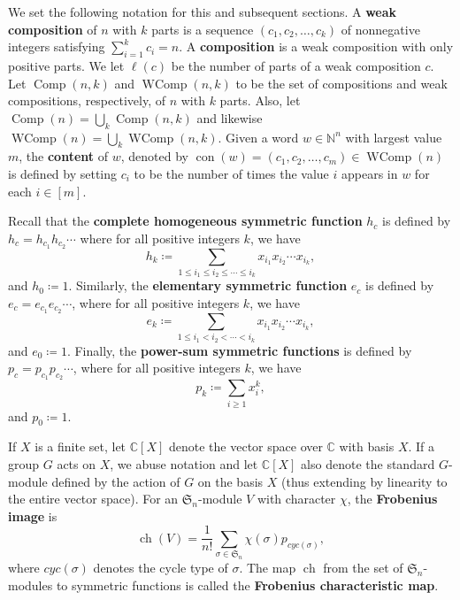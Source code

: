 \documentclass{amsart}
\newcommand{\N}{\mathbb{N}}
\renewcommand{\S}{\mathfrak{S}}
\newcommand{\CC}{\mathbb{C}}
\DeclareMathOperator{\Comp}{Comp}
\DeclareMathOperator{\WComp}{WComp}
\DeclareMathOperator{\ch}{ch}
\DeclareMathOperator{\con}{con}
\newcommand{\defterm}{\textbf}
\theoremstyle{definition}
\begin{document}
We set the following notation for this and subsequent sections. A \textbf{weak composition} of $n$ with $k$ parts is a sequence $(c_1,c_2,\dots,c_k)$ of nonnegative integers satisfying $\sum_{i=1}^k c_i=n$. 
A \textbf{composition} is a weak composition with only positive parts. 
We let $\ell(c)$ be the number of parts of a weak composition $c$.
Let $\Comp(n,k)$ and $\WComp(n,k)$ to be the set of compositions and weak compositions, respectively, of $n$ with $k$ parts. 
Also, let $\Comp(n)=\bigcup_{k}\Comp(n,k)$ and likewise $\WComp(n)=\bigcup_{k}\WComp(n,k)$. 
Given a word $w\in \N^n$ with largest value $m$, the \textbf{content} of $w$, denoted by $\con(w)=(c_1,c_2,\ldots,c_m)\in\WComp(n)$ is defined by setting $c_i$ to be the number of times the value $i$ appears in $w$ for each $i\in[m]$.

Recall that the \defterm{complete homogeneous symmetric function} 
$h_c$ is defined by $h_c=h_{c_1}h_{c_2}\cdots$ where for all positive integers $k$, we have 
\[h_k\coloneqq \sum_{1\leq i_1\leq i_2\leq \cdots\leq i_k}x_{i_1}x_{i_2}\cdots x_{i_k},\]
and $h_0\coloneqq 1$. 
Similarly, the \defterm{elementary symmetric function} $e_c$ is defined by $e_c=e_{c_1}e_{c_2}\cdots$, where for all positive integers $k$, we have 
\[e_k\coloneqq \sum_{1\leq i_1< i_2<\cdots<i_k}x_{i_1}x_{i_2}\cdots x_{i_k},\]
and $e_0\coloneqq1$. 
Finally, the \defterm{power-sum symmetric functions} 
is defined by $p_c=p_{c_1}p_{c_2}\cdots $, where for all positive integers $k$, we have
\[p_k\coloneqq \sum_{i\geq 1}x_i^k,\]
and $p_0\coloneqq 1$.

If $X$ is a finite set, let $\CC[X]$ denote the vector space over $\CC$ with basis $X$. 
If a group $G$ acts on $X$, we abuse notation and let $\CC[X]$ also denote the standard $G$-module defined by the action of $G$ on the basis $X$ (thus extending by linearity to the entire vector space). 
For an $\S_n$-module $V$ with character $\chi$, the \defterm{Frobenius image} is 
\[\ch(V)=\frac{1}{n!}\sum_{\sigma\in \S_n}\chi(\sigma)p_{cyc(\sigma)},\]
where $cyc(\sigma)$ denotes the cycle type of $\sigma$. The map $\ch$ from the set of $\S_n$-modules to symmetric functions is called the \defterm{Frobenius characteristic map}. 
\end{document}
